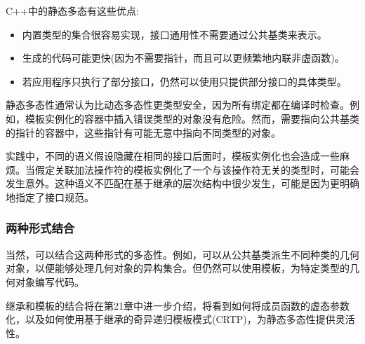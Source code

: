 C++中的静态多态有这些优点:

\begin{itemize}
\item 
内置类型的集合很容易实现，接口通用性不需要通过公共基类来表示。

\item 
生成的代码可能更快(因为不需要指针，而且可以更频繁地内联非虚函数)。

\item 
若应用程序只执行了部分接口，仍然可以使用只提供部分接口的具体类型。
\end{itemize}

静态多态性通常认为比动态多态性更类型安全，因为所有绑定都在编译时检查。例如，模板实例化的容器中插入错误类型的对象没有危险。然而，需要指向公共基类的指针的容器中，这些指针有可能无意中指向不同类型的对象。

实践中，不同的语义假设隐藏在相同的接口后面时，模板实例化也会造成一些麻烦。当假定关联加法操作符的模板实例化了一个与该操作符无关的类型时，可能会发生意外。这种语义不匹配在基于继承的层次结构中很少发生，可能是因为更明确地指定了接口规范。

\subsubsection{两种形式结合}

当然，可以结合这两种形式的多态性。例如，可以从公共基类派生不同种类的几何对象，以便能够处理几何对象的异构集合。但仍然可以使用模板，为特定类型的几何对象编写代码。

继承和模板的结合将在第21章中进一步介绍，将看到如何将成员函数的虚态参数化，以及如何使用基于继承的奇异递归模板模式(CRTP)，为静态多态性提供灵活性。




























